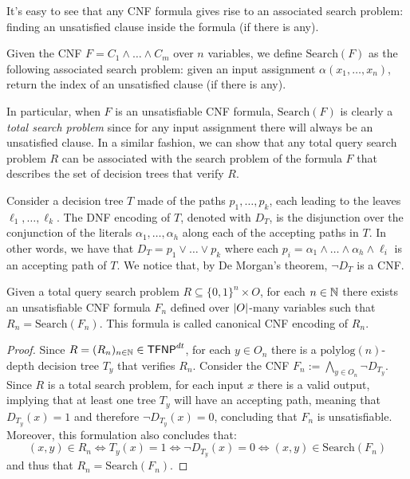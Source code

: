 
It's easy to see that any CNF formula gives rise to an associated search problem: finding an unsatisfied clause inside the formula (if there is any).

\begin{definition}
    Given the CNF $F = C_1 \land \ldots \land C_m$ over $n$ variables, we define  $\mathrm{Search}(F)$ as the following associated search problem: given an input assignment $\alpha(x_1, \ldots, x_n)$, return the index of an unsatisfied clause (if there is any).
\end{definition}

In particular, when $F$ is an unsatisfiable CNF formula, $\mathrm{Search}(F)$ is clearly a \textit{total search problem} since for any input assignment there will always be an unsatisfied clause. In a similar fashion, we can show that any total query search problem $R$ can be associated with the search problem of the formula $F$ that describes the set of decision trees that verify $R$.

Consider a decision tree $T$ made of the paths $p_1, \ldots, p_k$, each leading to the leaves $\ell_1, \ldots, \ell_k$. The DNF encoding of $T$, denoted with $D_T$, is the disjunction over the conjunction of the literals $\alpha_1, \ldots, \alpha_h$ along each of the accepting paths in $T$. In other words, we have that $D_T = p_1 \lor \ldots \lor p_k$ where each $p_i = \alpha_1 \land \ldots \land \alpha_h \land \ell_i$ is an accepting path of $T$. We notice that, by De Morgan's theorem, $\lnot{D_T}$ is a CNF.

\begin{proposition}
    \label{Rdt = Search(F)}
    Given a total query search problem $R \subseteq \{0,1\}^n \times O$, for each $n \in \mathbb{N}$ there exists an unsatisfiable CNF formula $F_n$ defined over $\left|O\right|$-many variables such that $R_n = \mathrm{Search}(F_n)$. This formula is called canonical CNF encoding of $R_n$.
\end{proposition}

\begin{proof}
    Since $R = (R_n)_{n \in \mathbb{N}} \in \textsf{TFNP}^{dt}$, for each $y \in O_n$ there is a $\mathrm{polylog}(n)$-depth decision tree $T_y$ that verifies $R_n$. Consider the CNF $F_n := \bigwedge\limits_{y \in O_n} \lnot{D_{T_y}}$. Since $R$ is a total search problem, for each input $x$ there is a valid output, implying that at least one tree $T_y$ will have an accepting path, meaning that $D_{T_y}(x) = 1$ and therefore $\lnot{D_{T_y}}(x) = 0$, concluding that $F_n$ is unsatisfiable. Moreover, this formulation also concludes that:
    \[(x,y) \in R_n \iff T_y(x) = 1 \iff \lnot{D_{T_y}}(x) = 0 \iff (x,y) \in \mathrm{Search}(F_n)\]
    and thus that $R_n = \mathrm{Search}(F_n)$.

\end{proof}

